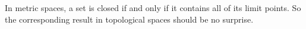 \begin{comment}

\ActivitySolution

\ba
\item  Neither $a$ nor $b$ is a limit point of $\{c,d\}$ since the open neighborhood $\{a,b\}$ contains no point in $\{c,d\}$ different than $a$ or $b$. The only open set that contains $c$ or $d$ is $X$, so that is the only neighborhood of $c$ or $d$. Since $X$ contains a point in $\{c,d\}$ that is different than $c$ (or $d$), both $c$ and $d$ are limit points of $\{c,d\}$. 

\item  None of the points $b$, $d$, $e$, or $f$ is a limit point of $\{a,b\}$ since the open neighborhood $\{b,d,e,f\}$ contains no point in $\{a,b\}$ different than $b$, $d$, $e$, or $f$. Any neighborhood of $a$ or $c$ must contain one of the open sets $\{a,b,c\}$ or $X$. So every neighborhood of $a$ or $c$ contains a point of $\{a,b\}$ different than $a$ or $c$. Therefore, the limit points of $\{a,b\}$ are $a$ and $c$ and $\{a,b\}' = \{a,c\}$. 

\item  For any $x \in \{a,b\}$, the open neighborhood $\{x\}$ of $x$ does not contain any points in $\{a,b\}$ different than $x$. So the set $\{a,b\}$ has no limit points. 

\item  Any neighborhood of $0$ must contain $B(0) = \{-1,0,1\}$, and so every neighborhood of $0$ contains a point in $\{-1,0,1\}$ different from $0$. Similarly, any neighborhood of $2$ must contain $B(2) = \{1,2,3\}$, and so every neighborhood of $2$ contains a point in $\{-1,0,1\}$ different from $2$. Also, any neighborhood of $-2$ must contain $B(-2) = \{-3,-2,-1\}$, and so every neighborhood of $-2$ contains a point in $\{-1,0,1\}$ different from $-2$. Thus, $\{-2,0,2\} \subseteq \{-1,0,1\}'$. If $n$ is odd, then the open neighborhood $B(n) = \{n\}$ contains no points of $\{-1,0,1\}$ different than $n$. So no odd integer is a limit point of $\{-1,0,1\}$. If $n$ is an even integer different than $-2$, $0$, and $2$, then the open neighborhood $B(n) = \{n-1,n,n+1\}$ contains no points in $\{-1,0,1\}$. Therefore, $\{-1,0,1\}' = \{-2,0,2\}$. 

\ea

\end{comment}

In metric spaces, a set is closed if and only if it contains all of its limit points. So the corresponding result in topological spaces should be no surprise. 

